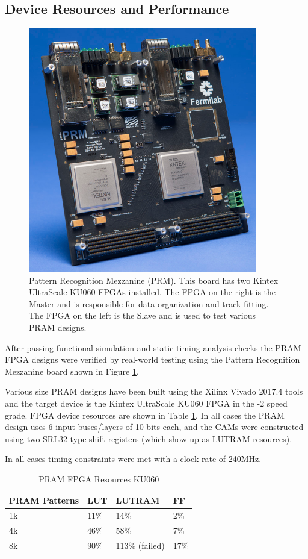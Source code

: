 \documentclass[letterpaper]{article}
\begin{document}
\subsection{Device Resources and Performance}

\begin{figure}
\centering
\includegraphics[width=10cm]{prm.png}
\caption[Pattern Recognition Mezzanine]{Pattern Recognition Mezzanine (PRM). This board has two Kintex UltraScale KU060 FPGAs installed. The FPGA on the right is the Master and is responsible for data organization and track fitting. The FPGA on the left is the Slave and is used to test various PRAM designs.}
\label{prm}
\end{figure}

After passing functional simulation and static timing analysis checks the PRAM FPGA designs were verified by real-world testing using the Pattern Recognition Mezzanine board shown in Figure \ref{prm}.

Various size PRAM designs have been built using the Xilinx Vivado 2017.4 tools and the target device is the Kintex UltraScale KU060 FPGA in the -2 speed grade. FPGA device resources are shown in Table \ref{TableFPGA}. In all cases the PRAM design uses 6 input buses/layers of 10 bits each, and the CAMs were constructed using two SRL32 type shift registers (which show up as LUTRAM resources). 

In all cases timing constraints were met with a clock rate of 240MHz. 

\begin{table}[htp]
\centering
\caption{PRAM FPGA Resources KU060} 
\label{TableFPGA}
\begin{tabular}{|l|l|l|l|}
\hline
PRAM Patterns & LUT & LUTRAM & FF   \\
\hline
1k & 11\%  & 14\%           & 2\%  \\
4k & 46\%  & 58\%           & 7\%  \\
8k & 90\%  & 113\% (failed) & 17\% \\
\hline
\end{tabular}
\end{table}
\end{document}
